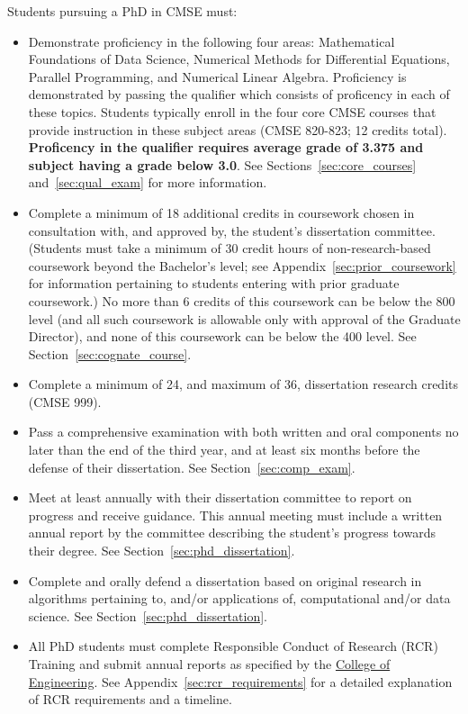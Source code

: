 Students pursuing a PhD in CMSE must:

\begin{itemize}
\item  Demonstrate proficiency in the following four areas:
  Mathematical Foundations of Data Science, Numerical Methods for
  Differential Equations, Parallel Programming, and Numerical Linear
  Algebra.  Proficiency is demonstrated by passing the qualifier
  which consists of proficency in each of these
  topics.  Students typically enroll in the four core CMSE courses
  that provide instruction in these subject areas (CMSE 820-823; 12
  credits total).  \textbf{Proficency in the qualifier requires
  average grade of 3.375 and subject having a grade below 3.0}.  See
Sections~\ref{sec:core_courses} and~\ref{sec:qual_exam} for more information.

\item Complete a minimum of 18 additional credits in coursework
  chosen in consultation with, and approved by, the student's
  dissertation committee.  (Students must take a minimum of 30 credit
  hours of non-research-based coursework beyond the Bachelor's level;
  see Appendix~\ref{sec:prior_coursework} for information pertaining
  to students entering with prior graduate coursework.)
  No more than 6 credits of this coursework can be below the 800 level
  (and all such coursework is allowable only with approval of the
  Graduate Director), and none of this coursework can be below the 400
  level.  See Section~\ref{sec:cognate_course}.  

\item Complete a minimum of 24, and maximum of 36, dissertation
  research credits (CMSE 999).

\item Pass a comprehensive examination with both written and oral
  components no later than the end of the third year, and at least six months before the defense of their
  dissertation.  See Section~\ref{sec:comp_exam}.

\item Meet at least annually with their dissertation committee to report on
  progress and receive guidance.  This annual meeting must include a
  written annual report by the committee describing the student's
  progress towards their degree.   See Section~\ref{sec:phd_dissertation}.

\item Complete and orally defend a dissertation based on original
  research in algorithms pertaining to, and/or applications of,
  computational and/or data science.  See Section~\ref{sec:phd_dissertation}.

\item All PhD students must complete Responsible Conduct of Research (RCR)
  Training and submit annual reports as specified by the
  \href{https://www.egr.msu.edu/academics/graduate/rcr}{College of
    Engineering}.  See Appendix~\ref{sec:rcr_requirements} for a
  detailed explanation of RCR requirements and a timeline.

\end{itemize}

